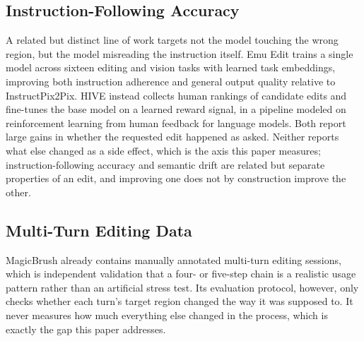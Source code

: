 \subsection{Instruction-Following Accuracy}
A related but distinct line of work targets not the model touching the wrong region, but the model misreading the instruction itself. Emu Edit \cite{ref_emuedit} trains a single model across sixteen editing and vision tasks with learned task embeddings, improving both instruction adherence and general output quality relative to InstructPix2Pix. HIVE \cite{ref_hive} instead collects human rankings of candidate edits and fine-tunes the base model on a learned reward signal, in a pipeline modeled on reinforcement learning from human feedback for language models. Both report large gains in whether the requested edit happened as asked. Neither reports what else changed as a side effect, which is the axis this paper measures; instruction-following accuracy and semantic drift are related but separate properties of an edit, and improving one does not by construction improve the other.

\subsection{Multi-Turn Editing Data}
MagicBrush \cite{ref_magicbrush} already contains manually annotated multi-turn editing sessions, which is independent validation that a four- or five-step chain is a realistic usage pattern rather than an artificial stress test. Its evaluation protocol, however, only checks whether each turn's target region changed the way it was supposed to. It never measures how much everything else changed in the process, which is exactly the gap this paper addresses.

\begin{table}[H]
\caption{Capability Comparison of Related Approaches}
\label{tab:capability}
\centering
\renewcommand{\arraystretch}{1.0}
\end{table}

